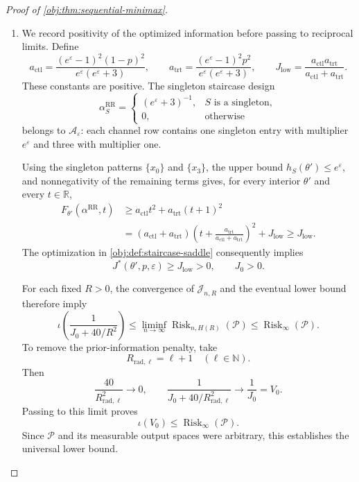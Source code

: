 \documentclass[11pt]{article}
\begin{document}
\begin{proof}[Proof of \cref{obj:thm:sequential-minimax}]
\begin{enumerate}
\item
We record positivity of the optimized information before passing to reciprocal limits. Define
\[
a_{\mathrm{ctl}}
=
\frac{(e^\varepsilon-1)^2(1-p)^2}
{e^\varepsilon(e^\varepsilon+3)},
\qquad
a_{\mathrm{trt}}
=
\frac{(e^\varepsilon-1)^2p^2}
{e^\varepsilon(e^\varepsilon+3)},
\qquad
J_{\mathrm{low}}
=
\frac{a_{\mathrm{ctl}}a_{\mathrm{trt}}}
{a_{\mathrm{ctl}}+a_{\mathrm{trt}}}.
\]
These constants are positive. The singleton staircase design
\[
\alpha^{\mathrm{RR}}_S
=
\begin{cases}
(e^\varepsilon+3)^{-1},&S\text{ is a singleton},\\
0,&\text{otherwise}
\end{cases}
\]
belongs to \(\mathcal A_\varepsilon\): each channel row contains one singleton entry with multiplier \(e^\varepsilon\) and three with multiplier one.

Using the singleton patterns \(\{x_0\}\) and \(\{x_3\}\), the upper bound \(h_S(\theta')\le e^\varepsilon\), and nonnegativity of the remaining terms gives, for every interior \(\theta'\) and every \(t\in\mathbb R\),
\[
\begin{aligned}
F_{\theta'}(\alpha^{\mathrm{RR}},t)
&\ge
a_{\mathrm{ctl}}t^2+a_{\mathrm{trt}}(t+1)^2\\
&=
(a_{\mathrm{ctl}}+a_{\mathrm{trt}})
\left(t+\frac{a_{\mathrm{trt}}}
{a_{\mathrm{ctl}}+a_{\mathrm{trt}}}\right)^2
+J_{\mathrm{low}}
\ge J_{\mathrm{low}}.
\end{aligned}
\]
The optimization in \cref{obj:def:staircase-saddle} consequently implies
\[
J^*(\theta',p,\varepsilon)\ge J_{\mathrm{low}}>0,
\qquad
J_0>0.
\]

For each fixed \(R>0\), the convergence of \(\mathcal J_{n,R}\) and the eventual lower bound therefore imply
\[
\iota\!\left(\frac1{J_0+40/R^2}\right)
\le
\liminf_{n\to\infty}
\operatorname{Risk}_{n,H(R)}(\mathcal P)
\le
\operatorname{Risk}_{\infty}(\mathcal P).
\]
To remove the prior-information penalty, take
\[
R_{\mathrm{rad},\ell}=\ell+1\quad(\ell\in\mathbb N).
\]
Then
\[
\frac{40}{R_{\mathrm{rad},\ell}^2}\longrightarrow0,
\qquad
\frac1{J_0+40/R_{\mathrm{rad},\ell}^2}\longrightarrow\frac1{J_0}=V_0.
\]
Passing to this limit proves
\[
\iota(V_0)\le\operatorname{Risk}_{\infty}(\mathcal P).
\]
Since \(\mathcal P\) and its measurable output spaces were arbitrary, this establishes the universal lower bound.


\end{enumerate}
\end{proof}
\end{document}
